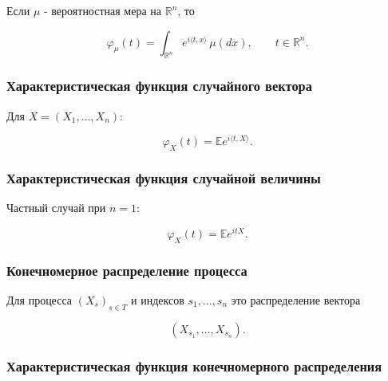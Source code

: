 \documentclass[
  11pt,
  a4paper,
]{article}
\begin{document}
Если \(\mu\) - вероятностная мера на \(\mathbb R^n\), то

\[
\varphi_\mu(t)=\int_{\mathbb R^n} e^{i\langle t,x\rangle}\,\mu(dx),
\qquad t\in\mathbb R^n.
\]

\subsubsection{Характеристическая функция случайного
вектора}\label{ux445ux430ux440ux430ux43aux442ux435ux440ux438ux441ux442ux438ux447ux435ux441ux43aux430ux44f-ux444ux443ux43dux43aux446ux438ux44f-ux441ux43bux443ux447ux430ux439ux43dux43eux433ux43e-ux432ux435ux43aux442ux43eux440ux430}

Для \(X=(X_1,\ldots,X_n)\):

\[
\varphi_X(t)=\mathbb E e^{i\langle t,X\rangle}.
\]

\subsubsection{Характеристическая функция случайной
величины}\label{ux445ux430ux440ux430ux43aux442ux435ux440ux438ux441ux442ux438ux447ux435ux441ux43aux430ux44f-ux444ux443ux43dux43aux446ux438ux44f-ux441ux43bux443ux447ux430ux439ux43dux43eux439-ux432ux435ux43bux438ux447ux438ux43dux44b}

Частный случай при \(n=1\):

\[
\varphi_X(t)=\mathbb E e^{itX}.
\]

\subsubsection{Конечномерное распределение
процесса}\label{ux43aux43eux43dux435ux447ux43dux43eux43cux435ux440ux43dux43eux435-ux440ux430ux441ux43fux440ux435ux434ux435ux43bux435ux43dux438ux435-ux43fux440ux43eux446ux435ux441ux441ux430}

Для процесса \((X_s)_{s\in T}\) и индексов \(s_1,\ldots,s_n\) это
распределение вектора

\[
(X_{s_1},\ldots,X_{s_n}).
\]

\subsubsection{Характеристическая функция конечномерного
распределения}\label{ux445ux430ux440ux430ux43aux442ux435ux440ux438ux441ux442ux438ux447ux435ux441ux43aux430ux44f-ux444ux443ux43dux43aux446ux438ux44f-ux43aux43eux43dux435ux447ux43dux43eux43cux435ux440ux43dux43eux433ux43e-ux440ux430ux441ux43fux440ux435ux434ux435ux43bux435ux43dux438ux44f}
\end{document}
